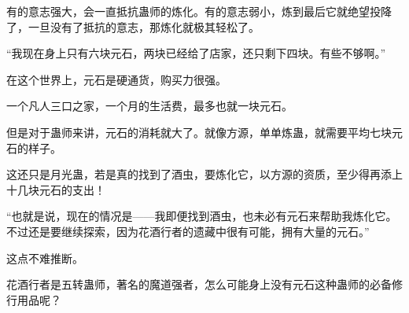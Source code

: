 \begin{this_body}
有的意志强大，会一直抵抗蛊师的炼化。有的意志弱小，炼到最后它就绝望投降了，一旦没有了抵抗的意志，那炼化就极其轻松了。

“我现在身上只有六块元石，两块已经给了店家，还只剩下四块。有些不够啊。”

在这个世界上，元石是硬通货，购买力很强。

一个凡人三口之家，一个月的生活费，最多也就一块元石。

但是对于蛊师来讲，元石的消耗就大了。就像方源，单单炼蛊，就需要平均七块元石的样子。

这还只是月光蛊，若是真的找到了酒虫，要炼化它，以方源的资质，至少得再添上十几块元石的支出！

“也就是说，现在的情况是——我即便找到酒虫，也未必有元石来帮助我炼化它。不过还是要继续探索，因为花酒行者的遗藏中很有可能，拥有大量的元石。”

这点不难推断。

花酒行者是五转蛊师，著名的魔道强者，怎么可能身上没有元石这种蛊师的必备修行用品呢？

\end{this_body}

